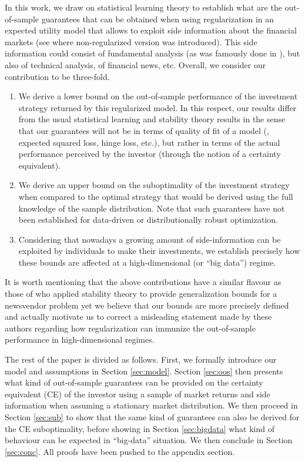 In this work, we draw on statistical learning theory to establish what are the
out-of-sample guarantees that can be obtained when using regularization in an expected
utility model that allows to exploit side information about the financial markets (see
\cite{brandt2009parametric} where non-regularized version was introduced).  This side
information could consist of fundamental analysis (as was famously done in
\cite{fama1993common}), but also of technical analysis, of financial news, etc. Overall,
we consider our contribution to be three-fold.
\begin{enumerate}
\item We derive a lower bound on the out-of-sample performance of the investment strategy
  returned by this regularized model.  In this respect, our results differ from the usual
  statistical learning and stability theory results in the sense that our guarantees will
  not be in terms of quality of fit of a model (\eg, expected squared loss, hinge loss,
  etc.), but rather in terms of the actual performance perceived by the investor (through
  the notion of a certainty equivalent).
\item We derive an upper bound on the suboptimality of the investment strategy when
  compared to the optimal strategy that would be derived using the full knowledge of the
  sample distribution. Note that such guarantees have not been established for data-driven
  or distributionally robust optimization.
\item Considering that nowadays a growing amount of side-information can be exploited by
  individuals to make their investments, we establish precisely how these bounds are
  affected at a high-dimensional (or ``big data'') regime.
\end{enumerate}
It is worth mentioning that the above contributions have a similar flavour as those of
\cite{rudin2015big} who applied stability theory to provide generalization bounds for a
newsvendor problem yet we believe that our bounds are more precisely defined and actually
motivate us to correct a misleading statement made by these authors regarding how
regularization can immunize the out-of-sample performance in high-dimensional regimes.

The rest of the paper is divided as follows. First, we formally introduce our model and
assumptions in Section \ref{sec:model}. Section \ref{sec:oos} then presents what kind of
out-of-sample guarantees can be provided on the certainty equivalent (CE) of the investor
using a sample of market returns and side information when assuming a stationary market
distribution. We then proceed in Section \ref{sec:sub} to show that the same kind of
guarantees can also be derived for the CE suboptimality, before showing in Section
\ref{sec:bigdata} what kind of behaviour can be expected in ``big-data'' situation. We
then conclude in Section \ref{sec:conc}. All proofs have been pushed to the appendix
section.

